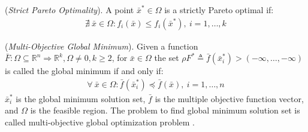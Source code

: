 %
\theoremstyle{definition}
\begin{definition}{(\textit{Strict Pareto Optimality}).}\label{defC10}
A point $\bar x^\ast \in \Omega$ is a strictly Pareto optimal if: 
%
\begin{equation} \label{equation124}
  \begin{aligned}
    \nexists \ \bar x \in \Omega : f_i(\bar x) \leq f_i(\bar x^\ast), \ i = 1, \ldots , k
\end{aligned}
\end{equation}
%
\end{definition}
%
\theoremstyle{definition}
\begin{definition}{(\textit{Multi-Objective Global Minimum}).}\label{defC11}
Given a function $\bar F : \Omega \subseteq \mathbb{R}^n \Rightarrow \mathbb{R}^k, \Omega \not=0, k \geq 2$, for $\bar x \in \Omega$ the set $\rho F^\ast \triangleq \bar f(\bar x^\ast_i) > (-\infty, \ldots, -\infty)$ is called the global minimum if and only if:
%
\begin{equation} \label{equation125}
  \begin{aligned}
    \forall \ \bar x \in \Omega : \bar f(\bar x^\ast_i) \preceq \bar f(\bar x), \ i = 1, \ldots, n
\end{aligned}
\end{equation}
%
$\bar x^\ast_i$ is the global minimum solution set, $\bar f$ is the multiple objective function vector, and $\Omega$ is the feasible region. The problem to find global minimum solution set is called multi-objective global optimization problem \cite{bib1Chiandussi}.
\end{definition}
%
